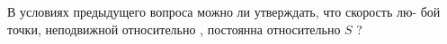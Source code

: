 В условиях предыдущего вопроса можно ли утверждать, что скорость лю-
бой точки, неподвижной относительно  , постоянна относительно $S$ ?

